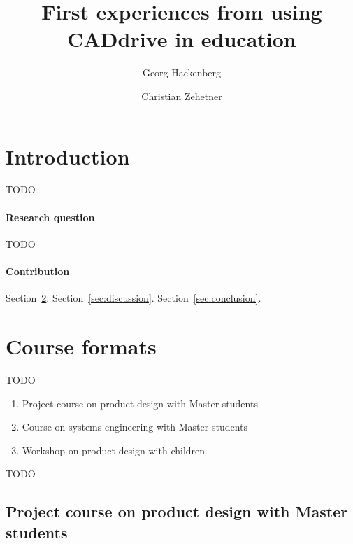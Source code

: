 \documentclass{PDS}
\begin{document}
\title{First experiences from using CADdrive in education}

\author{Georg Hackenberg}
\author{Christian Zehetner}

\address{School of Engineering, University of Applied Sciences Upper Austria, 4600 Wels, Austria}




\maketitle

\section{Introduction}
\label{sec:introduction}

TODO~\cite{Hackenberg_2023}

\paragraph{Research question}

TODO

\paragraph{Contribution}

Section~\ref{sec:contribution}.
Section~\ref{sec:discussion}.
Section~\ref{sec:conclusion}.

\section{Course formats}
\label{sec:contribution}

TODO

\begin{enumerate}
    \item Project course on product design with Master students
    \item Course on systems engineering with Master students
    \item Workshop on product design with children
\end{enumerate}

TODO

\subsection{Project course on product design with Master students}
\end{document}
